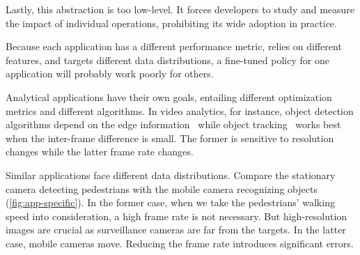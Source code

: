 Lastly, this abstraction is too low-level. It forces developers to study and measure the
impact of individual operations, prohibiting its wide adoption in practice.

 Because each application
has a different performance metric, relies on different features, and targets
different data distributions, a fine-tuned policy for one application will probably work
poorly for others.

Analytical applications have their own goals, entailing different optimization metrics and
different algorithms.
%
%
In video analytics, for instance,
object detection algorithms depend on the edge
information~\cite{canny1986computational, lowe2004distinctive, viola2001rapid}
while object tracking~\cite{allen2004object} works best when the inter-frame
difference is small. The former is sensitive to resolution changes while the
latter frame rate changes.

Similar applications face different data distributions. Compare the stationary
camera detecting pedestrians with the mobile camera recognizing objects
(\autoref{fig:app-specific}). In the former case, when we take the pedestrians'
walking speed into consideration, a high frame rate is not necessary. But
high-resolution images are crucial as surveillance cameras are far from the
targets. In the latter case, mobile cameras move. Reducing the frame rate
introduces significant errors.

